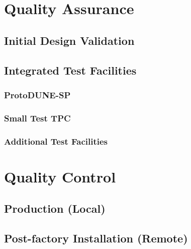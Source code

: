 \section{Quality Assurance}
\label{sec:fdsp-tpc-elec-qa}

\subsection{Initial Design Validation}
\label{sec:fdsp-tpc-elec-qa-initial}

\subsection{Integrated Test Facilities}
\label{sec:fdsp-tpc-elec-qa-facilities}

\subsubsection{ProtoDUNE-SP}
\label{sec:fdsp-tpc-elec-qa-facilities-pdune}

\subsubsection{Small Test TPC}
\label{sec:fdsp-tpc-elec-qa-facilities-small}

\subsubsection{Additional Test Facilities}
\label{sec:fdsp-tpc-elec-qa-facilities-other}


\section{Quality Control}
\label{sec:fdsp-tpc-elec-qc}

\subsection{Production (Local)}
\label{sec:fdsp-tpc-elec-qc-local}

\subsection{Post-factory Installation (Remote)}
\label{sec:fdsp-tpc-elec-qc-remote}



